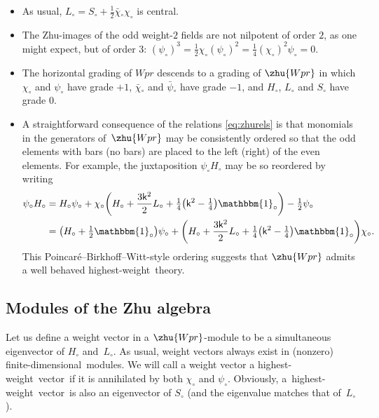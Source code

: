 \documentclass[10pt,a4paper]{amsart}
\numberwithin{equation}{section}
\newcommand{\wun}{\mathbbm{1}} %
\newcommand{\bchi}{\bar{\chi}{}} %
\newcommand{\bpsi}{\bar{\psi}{}} %
\newcommand{\kk}{\mathsf{k}} %
\DeclarePairedDelimiter{\brac}{\lparen}{\rparen} %
\newcommand{\VOA}[1]{\mathsf{#1}} %
\newcommand{\uwalg}[2]{\VOA{W}^{#1}_{\mathrm{#2}}} %
\newcommand{\upr}[1][\kk]{\uwalg{#1}{pr}} %
\newcommand{\zh}[1]{#1_{\circ}} %
\newcommand{\pbw}{Poincar\'{e}--Birkhoff--Witt}
\newcommand{\fdim}{finite-dimensional}
\newcommand{\hw}{highest-weight}
\newcommand{\hwv}{\hw\ vector}
\def\smash#1{#1}
\def\upr{Wpr}
\begin{document}
\begin{itemize}\itemsep=0pt
	\item As usual, $\zh{L} = \zh{S} + \frac{1}{2} \zh{\bchi}\zh{\chi}$ is central.
	\item The Zhu-images of the odd weight-$2$ fields are not nilpotent of order $2$, as one might expect, but of order $3$:
$(\zh{\psi})^3 = \frac{1}{2} \zh{\chi}(\zh{\psi})^2 = \frac{1}{4} (\zh{\chi})^2\zh{\psi} = 0$.
	\item The horizontal grading of \smash{$\upr$} descends to a grading of \smash{$\zhu{\upr}$} in which $\zh{\chi}$ and $\zh{\psi}$ have grade $+1$, $\zh{\bchi}$ and $\zh{\bpsi}$ have grade $-1$, and $\zh{H}$, $\zh{L}$ and $\zh{S}$ have grade $0$.
	\item A straightforward consequence of the relations \eqref{eq:zhurels} is that monomials in the generators of~$\zhu{\upr}$ may be consistently ordered so that the odd elements with bars (no bars) are placed to the left (right) of the even elements.
	For example, the juxtaposition $\zh{\psi} \zh{H}$ may be so reordered by writing
	\begin{align*}
			\zh{\psi} \zh{H}
			&= \zh{H}\zh{\psi} + \zh{\chi}\brac[\bigg]{\zh{H}+\frac{3\kk^2}{2}\zh{L}+\tfrac{1}{4}\bigl(\kk^2-\tfrac{1}{4}\bigr)\zh{\wun}} - \tfrac{1}{2}\zh{\psi} \\
			&= \bigl(\zh{H} + \tfrac{1}{2}\zh{\wun}\bigr) \zh{\psi} + \brac[\bigg]{\zh{H}+\frac{3\kk^2}{2}\zh{L}+\tfrac{1}{4}\bigl(\kk^2-\tfrac{1}{4}\bigr)\zh{\wun}} \zh{\chi}.
	\end{align*}
	This \pbw-style ordering suggests that \smash{$\zhu{\upr}$} admits a well behaved \hw\ theory.
\end{itemize}


\subsection{Modules of the Zhu algebra} \label{sec:zhuwt}

Let us define a weight vector in a \smash{$\zhu{\upr}$}-module to be a simultaneous eigenvector of $\zh{H}$ and~$\zh{L}$.
As usual, weight vectors always exist in (nonzero) \fdim\ modules.
We will call a weight vector a \hwv\ if it is annihilated by both $\zh{\chi}$ and $\zh{\psi}$.
Obviously, a~\hwv\ is also an eigenvector of $\zh{S}$ (and the eigenvalue matches that of~$\zh{L}$).
\end{document}
